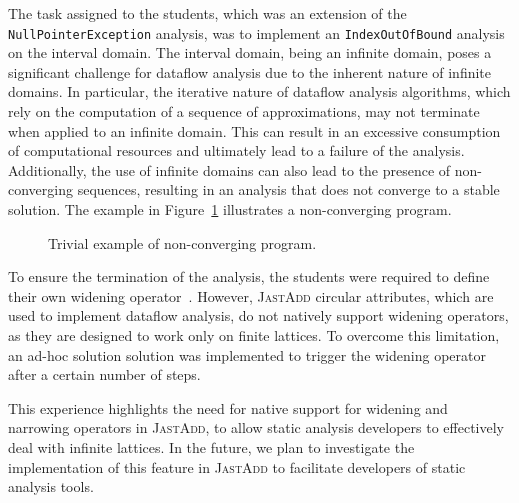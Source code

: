 The task assigned to the students, which was an extension of the \texttt{NullPointerException}
analysis, was to implement an \texttt{IndexOutOfBound} analysis on the interval domain.
The interval domain, being an infinite domain, poses a significant challenge for
dataflow analysis due to the inherent nature of infinite domains. In particular,
the iterative nature of dataflow analysis algorithms, which rely on the computation
of a sequence of approximations, may not terminate when applied to an infinite domain.
This can result in an excessive consumption of computational resources and ultimately
lead to a failure of the analysis. Additionally, the use of infinite domains can also
lead to the presence of non-converging sequences, resulting in an analysis that does
not converge to a stable solution. The example in Figure~\ref{fig:nonConverging}
illustrates a non-converging program.
\begin{figure}
	\centering
	\caption{\label{fig:nonConverging} Trivial example of non-converging program.}
\end{figure}

To ensure the termination of the analysis, the students were required to
define their own widening operator~\cite{Bagnara2003Widening}.
However, \textsc{JastAdd} circular attributes, which are used to implement dataflow
analysis, do not natively support widening operators, as they are designed
to work only on finite lattices. To overcome this limitation, an ad-hoc solution
solution was implemented to trigger the widening operator after a certain
number of steps.

This experience highlights the need for native support for widening and narrowing
operators in \textsc{JastAdd}, to allow static analysis developers to effectively deal with
infinite lattices. In the future, we plan to investigate the implementation of this
feature in \textsc{JastAdd} to facilitate developers of static analysis tools.


